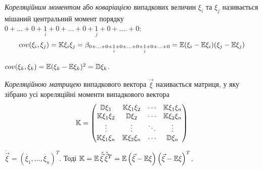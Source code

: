 \begin{definition}
    \emph{Кореляційним моментом} або 
    \emph{коваріацією} випадкових величин 
    $\xi_i$ та $\xi_j$ називається мішаний 
    центральний момент 
    порядку
    $0+...+0+\underset{i}{1}+0+...+0+\underset{j}{1}+0+....+0$:
    \begin{equation*}
        {cov}(\xi_i,\xi_j) = \mathbb{K}\xi_i\xi_j = \beta_{0+...+0+\underset{i}{1}+0+...
        +0+\underset{j}{1}+0+...+0}
        =
        \mathbb{E}(\xi_i-\mathbb{E}\xi_i)(\xi_j-\mathbb{E}\xi_j)
    \end{equation*}
\end{definition}
\begin{remark}
    ${cov}(\xi_k, \xi_k) = \mathbb{E}(\xi_k-\mathbb{E}\xi_k)^2 = \mathbb{D}\xi_k$.
\end{remark}
\begin{definition}
   \emph{Кореляційною матрицею} випадкового 
   вектора $\vec{\xi}$ називається матриця, у яку зібрано усі 
   кореляційні моменти випадкового вектора
   \begin{equation*}
       \mathbb{K} = 
       \begin{pmatrix}
           \mathbb{D}\xi_1 & \mathbb{K}\xi_1\xi_2 & \cdots & \mathbb{K}\xi_1\xi_n \\
           \mathbb{K}\xi_1\xi_2 & \mathbb{D}\xi_2 & \cdots & \mathbb{K}\xi_2\xi_n \\
           \vdots & \vdots & \ddots & \vdots \\
           \mathbb{K}\xi_1\xi_n & \mathbb{K}\xi_2\xi_n & \cdots & \mathbb{D}\xi_n
       \end{pmatrix}
   \end{equation*} 
\end{definition}
\begin{remark}
    $\mathring{\vec{\xi}} = \left(\mathring{\xi_1}, ..., \mathring{\xi_n}
    \right)^T$.
    Тоді $\mathbb{K} = \mathbb{E}\,\mathring{\vec{\xi}}\,\mathring{\vec{\xi}}^T = \mathbb{E} \left(\vec{\xi} - \mathbb{E}\xi\right)\left(\vec{\xi} - \mathbb{E}\xi\right)^T$.
\end{remark}

